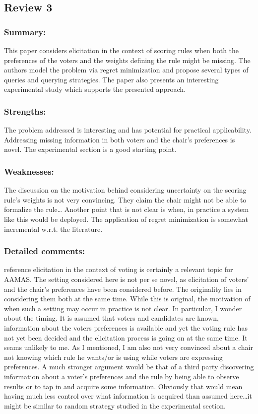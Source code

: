 \documentclass[version=3.21, pagesize, twoside=off, bibliography=totoc, DIV=calc, fontsize=12pt, a4paper]{scrartcl}
\begin{document}
\subsection{Review 3}
\subsubsection*{Summary:}
This paper considers elicitation in the context of scoring rules when both the preferences of the voters and the weights defining the rule might be missing. The authors model the problem via regret minimization and propose several types of queries and querying strategies. The paper also presents an interesting experimental study which supports the presented approach.
\subsubsection*{Strengths:}	The problem addressed is interesting and has potential for practical applicability.
Addressing missing information in both voters and the chair’s preferences is novel. The experimental section is a good starting point.
\subsubsection*{Weaknesses:}	The discussion on the motivation behind considering uncertainty on the scoring rule’s weights is not very convincing. They claim the chair might not be able to formalize the rule…
Another point that is not clear is when, in practice a system like this would be deployed.
The application of regret minimization is somewhat incremental w.r.t. the literature.

\subsubsection*{Detailed comments:}	reference elicitation in the context of voting is certainly a relevant topic for AAMAS.
The setting considered here is not per se novel, as elicitation of voters’ and the chair’s preferences have been considered before. The originality lies in considering them both at the same time.
While this is original, the motivation of when such a setting may occur in practice is not clear. In particular, I wonder about the timing. It is assumed that voters and candidates are known, information about the voters preferences is available and yet the voting rule has not yet been decided and the elicitation process is going on at the same time. It seams unlikely to me.
As I mentioned, I am also not very convinced about a chair not knowing which rule he wants/or is using while voters are expressing preferences. A much stronger argument would be that of a third party discovering information about a voter’s preferences and the rule by being able to observe results or to tap in and acquire some information. Obviously that would mean having much less control over what information is acquired than assumed here…it might be similar to random strategy studied in the experimental section.
\end{document}
